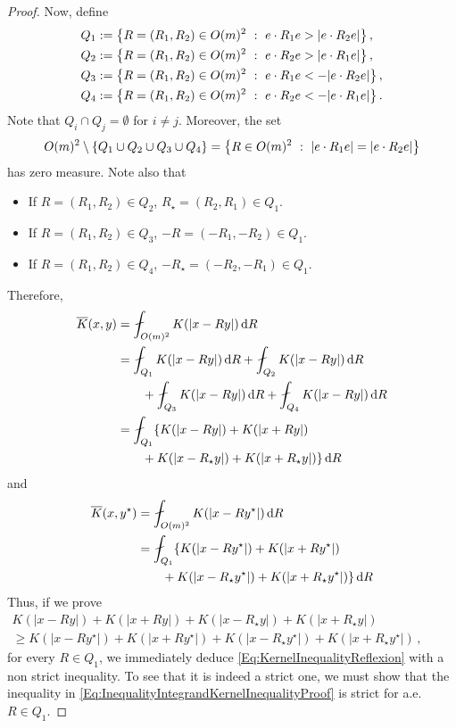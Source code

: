 \begin{proof}
Now, define
\begin{align*}
Q_1 &:= \left \{ R = (R_1,R_2) \in O(m)^2 \ : \ e\cdot R_1 e > |e\cdot R_2 e| \right \},\\
Q_2 &:= \left \{ R = (R_1,R_2) \in O(m)^2 \ : \ e\cdot R_2 e > |e\cdot R_1 e| \right \},\\
Q_3 &:= \left \{ R = (R_1,R_2) \in O(m)^2 \ : \ e\cdot R_1 e < -|e\cdot R_2 e| \right \},\\
Q_4 &:= \left \{ R = (R_1,R_2) \in O(m)^2 \ : \ e\cdot R_2 e < - |e\cdot R_1 e| \right \}.
\end{align*}
Note that $Q_i \cap Q_j = \emptyset$ for $i\neq j$. Moreover, the set
$$
O(m)^2 \setminus \{Q_1 \cup Q_2 \cup Q_3 \cup Q_4\} = \left \{ R\in O(m)^2 \ : \ |e\cdot R_1 e| = |e\cdot R_2 e| \right \}
$$
has zero measure. Note also that
\begin{itemize}
\item If $R = (R_1, R_2)\in Q_2$, $R_\star = (R_2, R_1) \in Q_1$.
\item If $R = (R_1, R_2)\in Q_3$, $-R = (-R_1, -R_2) \in Q_1$.
\item If $R = (R_1, R_2)\in Q_4$, $-R_\star = (-R_2, -R_1) \in Q_1$.
\end{itemize}
Therefore,
\begin{align*}
\overline{K} (x, y) &= \average_{O(m)^2} K(|x - R y|)\d R \\
& = \average_{Q_1} K(|x - R y|)\d R + \average_{Q_2} K(|x - R y|)\d R \\
& \quad \quad
+ \average_{Q_3} K(|x - R y|)\d R +
\average_{Q_4} K(|x - R y|)\d R \\
&= \average_{Q_1} \{K(|x - R y|) + K(|x + R y|) \\
&\quad \quad + K(|x - R_\star y|) + K(|x + R_\star y|)\}\d R
\end{align*}
and
\begin{align*}
\overline{K} (x, y^\star) &= \average_{O(m)^2} K(|x - R y^\star|)\d R \\
& = \average_{Q_1} \{K(|x - R y^\star|) + K(|x + R y^\star|) \\
&\quad \quad + K(|x - R_\star y^\star|) + K(|x + R_\star y^\star|)\}\d R
\end{align*}
Thus, if we prove
\begin{equation}
\label{Eq:InequalityIntegrandKernelInequalityProof}
\begin{split}
K(|x - R y|) + K(|x + R y|) + K(|x - R_\star y|) + K(|x + R_\star y|)
\quad \quad \quad \quad \quad \quad \quad \quad
\\
\geq
K(|x - R y^\star|) + K(|x + R y^\star|)+K(|x - R_\star y^\star|) + K(|x + R_\star y^\star|)\,,
\end{split}
\end{equation}
for every $R\in Q_1$, we immediately deduce \eqref{Eq:KernelInequalityReflexion} with a non strict
inequality. To see that it is indeed a strict one, we must show that the inequality in
\eqref{Eq:InequalityIntegrandKernelInequalityProof} is strict for a.e. $R \in Q_1$.



\end{proof}
